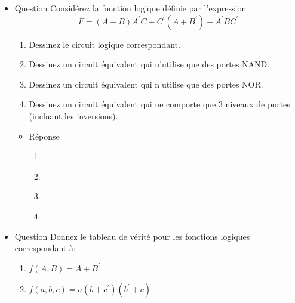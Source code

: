 \documentclass[letter, oneside]{book}
\begin{document}
\begin{itemize}
\item Question
\label{sec:org2a983c5}
Considérez la fonction logique définie par l'expression
$$
F =
  (A + B) A^{\prime} C + C^{\prime}(A+B^{\prime}) + A^{\prime}B
  C^{\prime}
$$

\begin{enumerate}
\item Dessinez le circuit logique correspondant.

\item Dessinez un circuit équivalent qui n'utilise que des portes
NAND.

\item Dessinez un circuit équivalent qui n'utilise que des portes
NOR.

\item Dessinez un circuit équivalent qui ne comporte que 3 niveaux de
portes (incluant les inversions).
\end{enumerate}

\begin{itemize}
\item Réponse
\label{sec:org6cf76ae}
\begin{enumerate}
\item \begin{center}

\end{center}
\item \begin{center}

\end{center}
\item \begin{center}

\end{center}
\item \begin{center}

\end{center}
\end{enumerate}
\end{itemize}

\item Question
\label{sec:org19644ab}
Donnez le tableau de vérité pour les fonctions logiques correspondant
à:

\begin{enumerate}
\item \(f(A, B) = A + B^{\prime}\)

\item \(f(a, b, c) = a(b+c^{\prime})(b^{\prime}+c)\)
\end{enumerate}


\end{itemize}
\end{document}
